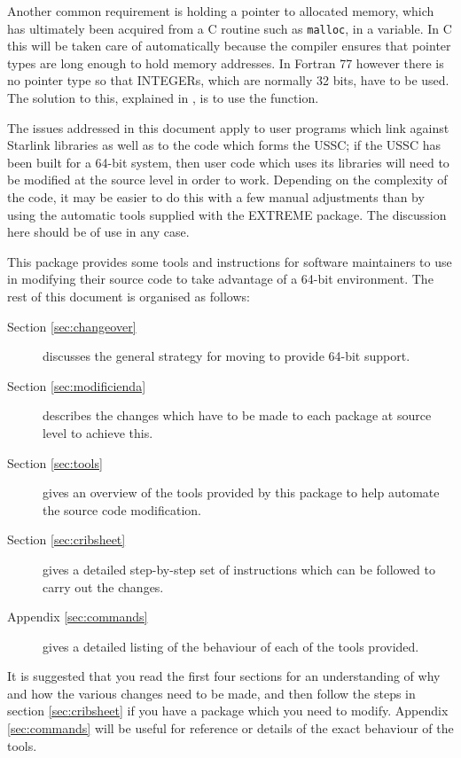 \documentclass[twoside,11pt,nolof]{starlink}
\providecommand{\cc}[1]{\texttt{#1}}
\begin{document}
Another common requirement is holding a pointer
to allocated memory, which has ultimately been
acquired from a C routine such as \cc{malloc},
in a variable.
In C this will be taken care of automatically because the compiler
ensures that pointer types are long enough to hold memory addresses.
In Fortran 77 however there is no pointer type so that INTEGERs, which are
normally 32 bits, have to be used.
The solution to this, explained in ,
is to use the  function.

The issues addressed in this document apply to user programs which link
against Starlink libraries as well as to the code which forms the USSC;
if the USSC has been built for a 64-bit system, then user code
which uses its libraries will need to be modified at the
source level in order to work.
Depending on the complexity of the code, it may be easier to do this
with a few manual adjustments than by using the automatic
tools supplied with the EXTREME package.
The discussion here should be of use in any case.

This package provides some tools and instructions for
software maintainers to use
in modifying their source code to take advantage of a 64-bit environment.
The rest of this document is organised as follows:
\begin{description}
%
\item[Section \ref{sec:changeover}]
discusses the general strategy for moving to provide 64-bit support.
%
\item[Section \ref{sec:modificienda}]
describes the changes which have to be made to each package at
source level to achieve this.
%
\item[Section \ref{sec:tools}]
gives an overview of the tools provided by this package to help automate
the source code modification.
%
\item[Section \ref{sec:cribsheet}]
gives a detailed step-by-step set of instructions which can be followed
to carry out the changes.
%
\item[Appendix \ref{sec:commands}]
gives a detailed listing of the behaviour of each of the tools provided.
%
\end{description}
It is suggested that you read the first four sections
for an understanding of why and how the various changes need to be
made, and then follow the steps in section \ref{sec:cribsheet}
if you have a package which you need to modify.
Appendix \ref{sec:commands} will be useful for reference or details
of the exact behaviour of the tools.
\end{document}
